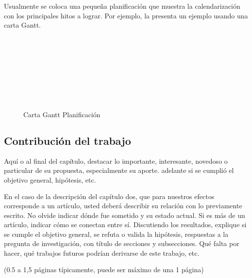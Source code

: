 Usualmente se coloca una pequeña planificación que muestra la calendarización con los principales hitos a lograr. Por ejemplo, la  presenta un ejemplo usando una carta Gantt.

\begin{figure}[hbtp]
    \begin{ganttchart}{1}{16}
	        \\
	         \\
	         \\
	         \\
	         \\
	         \\
	         \\
	        \end{ganttchart}
    \caption{Carta Gantt Planificación}
    \label{fig:Gantt}
\end{figure}


\subsection{Contribución del trabajo}

Aquí o al final del capítulo, destacar lo importante, interesante, novedoso o particular de su propuesta, especialmente su aporte. adelante si se cumplió el objetivo general, hipótesis, etc.

En el caso de la descripción del capítulo dos, que para nuestros efectos corresponde a un artículo, usted deberá describir su relación con lo previamente escrito. No olvide indicar dónde fue sometido y su estado actual. Si es más de un artículo, indicar cómo se conectan entre sí. Discutiendo los resultados, explique si se cumple el objetivo general, se refuta o valida la hipótesis, respuestas a la pregunta de investigación, con título de secciones y subsecciones. Qué falta por hacer, qué trabajos futuros podrían derivarse de este trabajo, etc.

(0.5 a 1,5 páginas típicamente, puede ser máximo de una 1 página)

